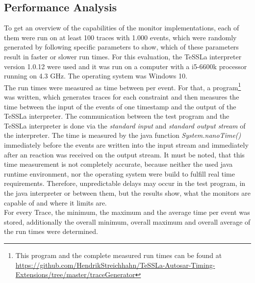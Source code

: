 \subsection{Performance Analysis}

To get an overview of the capabilities of the monitor implementations, each of them were run on at least 100 traces with 1.000 events, which were randomly generated by following specific parameters to show, which of these parameters result in faster or slower run times. For this evaluation, the TeSSLa interpreter version 1.0.12 were used and it was run on a computer with a i5-6600k processor running on 4.3 GHz. The operating system was Windows 10.\\ %
The run times were measured as time between per event. For that, a program\footnote{This program and the complete measured run times can be found at \href{https://github.com/HendrikStreichhahn/TeSSLa-Autosar-Timing-Extensions/tree/master/traceGenerator}{https://github.com/HendrikStreichhahn/TeSSLa-Autosar-Timing-Extensions/tree/master/traceGenerator}} was written, which generates traces for each constraint and then measures the time between the input of the events of one timestamp and the output of the TeSSLa interpreter. The communication between the test program and the TeSSLa interpreter is done via the \textit{standard input} and \textit{standard output stream} of the interpreter. The time is measured by the java function \textit{System.nanoTime()} immediately before the events are written into the input stream and immediately after an reaction was received on the output stream. It must be noted, that this time measurement is not completely accurate, because neither the used java runtime environment, nor the operating system were build to fulfill real time requirements. Therefore, unpredictable delays may occur in the test program, in the java interpreter or between them, but the results show, what the monitors are capable of and where it limits are.\\
For every Trace, the minimum, the maximum and the average time per event was stored, additionally the overall minimum, overall maximum and overall average of the run times were determined.

